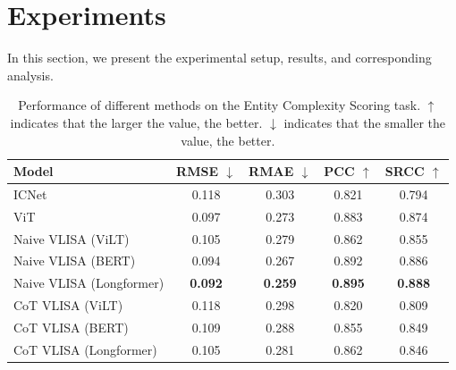 \section{Experiments}

In this section, we present the experimental setup, results, and corresponding analysis.

\begin{table}[h]
    \centering
    \begin{tabular}{l|cccc}
        \toprule
        Model & RMSE $\downarrow$ &  RMAE $\downarrow$ &  PCC $\uparrow$ &  SRCC $\uparrow$ \\
        \midrule 
        ICNet & 0.118 & 0.303 & 0.821 & 0.794 \\  %
        ViT & 0.097 & 0.273 & 0.883 & 0.874  \\ 
        Naive VLISA (ViLT) & 0.105 & 0.279 & 0.862 & 0.855 \\ %
        Naive VLISA (BERT) & 0.094 & 0.267 & 0.892 & 0.886  \\ 			
        Naive VLISA (Longformer) & \textbf{0.092} & \textbf{0.259} & \textbf{0.895} & \textbf{0.888}  \\			
        CoT VLISA (ViLT) & 0.118 & 0.298 & 0.820 & 0.809 \\ %
        CoT VLISA (BERT) & 0.109 & 0.288 & 0.855 & 0.849  \\ 
        CoT VLISA (Longformer) & 0.105 & 0.281 & 0.862 & 0.846  \\ 
        \bottomrule
\end{tabular}
\caption{Performance of different methods on the Entity Complexity Scoring task.
$\uparrow$ indicates that the larger the value, the better.
$\downarrow$ indicates that the smaller the value, the better.
}
\label{entity_reg}
\end{table}

